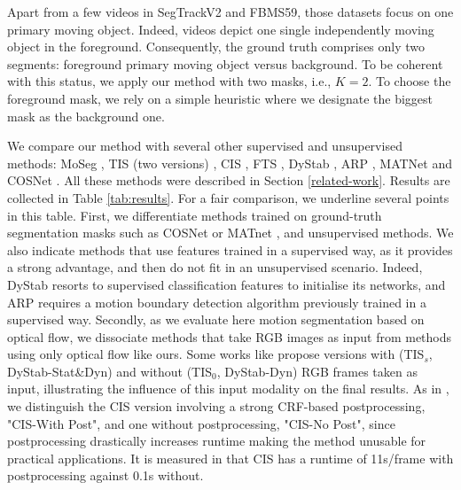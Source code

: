 \documentclass[10pt,twocolumn,letterpaper]{article}
\begin{document}
Apart from a few videos in SegTrackV2 and FBMS59, those datasets focus on one primary moving object. Indeed, videos depict one single independently moving object in the foreground. Consequently, the ground truth comprises only two segments: foreground primary moving object versus background. To be coherent with this status, we apply our method with two masks, i.e., $K=2$. To choose the foreground mask, we rely on a simple heuristic where we designate the biggest mask as the background one. 

We compare our method with several other supervised and unsupervised methods: MoSeg \cite{yang_motion-grouping_2021}, TIS (two versions) \cite{griffin_tukey-inspired_2019}, CIS \cite{yang_unsupervised_2019}, FTS \cite{papazoglou_fast_2013}, DyStab \cite{dystab}, ARP \cite{arp}, MATNet \cite{matnet} and COSNet \cite{cosnet}. All these methods were described in Section \ref{related-work}. Results are collected in Table \ref{tab:results}. For a fair comparison, we underline several points in this table. First, we differentiate methods trained on ground-truth segmentation masks such as COSNet \cite{cosnet} or MATnet \cite{matnet}, and unsupervised methods. We also indicate methods that use features trained in a supervised way, as it provides a strong advantage, and then do not fit in an unsupervised scenario. Indeed, DyStab \cite{dystab} resorts to supervised classification features to initialise its networks, and ARP \cite{arp} requires a motion boundary detection algorithm previously trained in a supervised way. Secondly, as we evaluate here motion segmentation based on optical flow, we dissociate methods that take RGB images as input from methods using only optical flow like ours. Some works like \cite{griffin_tukey-inspired_2019, dystab} propose versions with (TIS$_s$, DyStab-Stat\&Dyn) and without (TIS$_0$, DyStab-Dyn) RGB frames taken as input, illustrating the influence of this input modality on the final results. As in \cite{yang_motion-grouping_2021}, we distinguish the CIS version involving a strong CRF-based postprocessing, "CIS-With Post", and one without postprocessing, "CIS-No Post", since postprocessing drastically increases runtime making the method unusable for practical applications. It is measured in \cite{yang_motion-grouping_2021} that CIS \cite{yang_unsupervised_2019} has a runtime of 11s/frame with postprocessing against 0.1s without.
\end{document}
